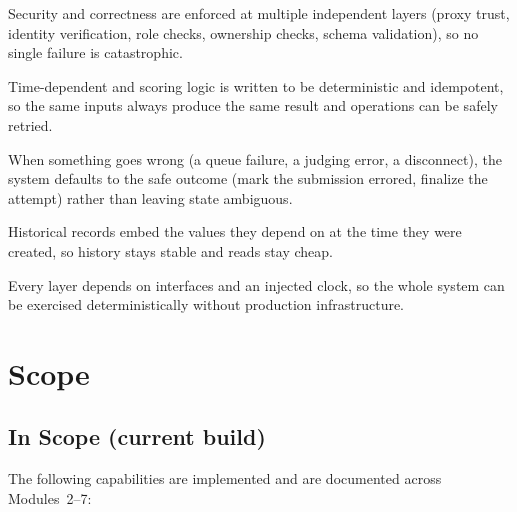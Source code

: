 \documentclass[12pt,a4paper,oneside]{report}
\begin{document}
\begin{description}[leftmargin=1.6em,style=nextline]
  \item[Defence in depth] Security and correctness are enforced at multiple
        independent layers (proxy trust, identity verification, role checks,
        ownership checks, schema validation), so no single failure is
        catastrophic.
  \item[Determinism] Time-dependent and scoring logic is written to be
        deterministic and idempotent, so the same inputs always produce the same
        result and operations can be safely retried.
  \item[Fail-safe over fail-open] When something goes wrong (a queue failure, a
        judging error, a disconnect), the system defaults to the safe outcome
        (mark the submission errored, finalize the attempt) rather than leaving
        state ambiguous.
  \item[Snapshots over joins] Historical records embed the values they depend on
        at the time they were created, so history stays stable and reads stay
        cheap.
  \item[Testability] Every layer depends on interfaces and an injected clock, so
        the whole system can be exercised deterministically without production
        infrastructure.
\end{description}

\chapter{Scope}

\section{In Scope (current build)}
The following capabilities are implemented and are documented across Modules~2--7:
\end{document}
